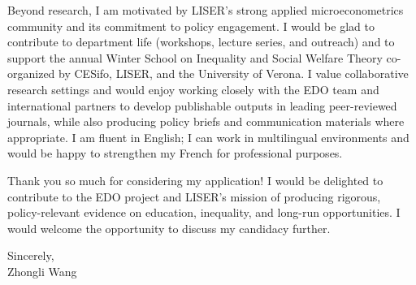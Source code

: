 \documentclass[11pt]{article}
\begin{document}
Beyond research, I am motivated by LISER's strong applied microeconometrics community and its commitment to policy engagement. I would be glad to contribute to department life (workshops, lecture series, and outreach) and to support the annual Winter School on Inequality and Social Welfare Theory co-organized by CESifo, LISER, and the University of Verona. I value collaborative research settings and would enjoy working closely with the EDO team and international partners to develop publishable outputs in leading peer-reviewed journals, while also producing policy briefs and communication materials where appropriate. I am fluent in English; I can work in multilingual environments and would be happy to strengthen my French for professional purposes.

Thank you so much for considering my application! I would be delighted to contribute to the EDO project and LISER's mission of producing rigorous, policy-relevant evidence on education, inequality, and long-run opportunities. I would welcome the opportunity to discuss my candidacy further.

\vspace{6mm}

\noindent Sincerely,\\[15mm]
\noindent Zhongli Wang
\end{document}
